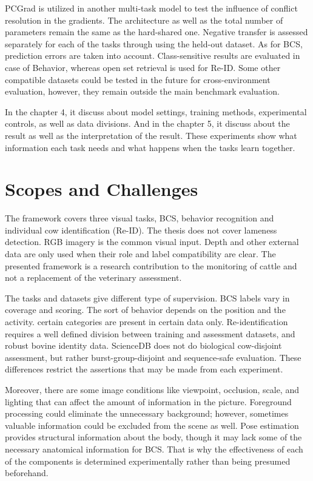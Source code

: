 PCGrad is utilized in another multi-task model to test the influence of conflict resolution in the gradients. The architecture as well as the total number of parameters remain the same as the hard-shared one. Negative transfer is assessed separately for each of the tasks through using the held-out dataset. As for BCS, prediction errors are taken into account. Class-sensitive results are evaluated in case of Behavior, whereas open set retrieval is used for Re-ID. Some other compatible datasets could be tested in the future for cross-environment evaluation, however, they remain outside the main benchmark evaluation.

In the chapter 4, it discuss about model settings, training methods, experimental controls, as well as data divisions. And in the chapter 5, it discuss about the result as well as the interpretation of the result. These experiments show what information each task needs and what happens when the tasks learn together.

\section{Scopes and Challenges}

The framework covers three visual tasks, BCS, behavior recognition and individual cow identification (Re-ID). The thesis does not cover lameness detection. RGB imagery is the common visual input. Depth and other external data are only used when their role and label compatibility are clear. The presented framework is a research contribution to the monitoring of cattle and not a replacement of the veterinary assessment.

The tasks and datasets give different type of supervision. BCS labels vary in coverage and scoring. The sort of behavior depends on the position and the activity. certain categories are present in certain data only. Re-identification requires a well defined division between training and assessment datasets, and robust bovine identity data. ScienceDB does not do biological cow-disjoint assessment, but rather burst-group-disjoint and sequence-safe evaluation. These differences restrict the assertions that may be made from each experiment.

Moreover, there are some image conditions like viewpoint, occlusion, scale, and lighting that can affect the amount of information in the picture. Foreground processing could eliminate the unnecessary background; however, sometimes valuable information could be excluded from the scene as well. Pose estimation provides structural information about the body, though it may lack some of the necessary anatomical information for BCS. That is why the effectiveness of each of the components is determined experimentally rather than being presumed beforehand.

